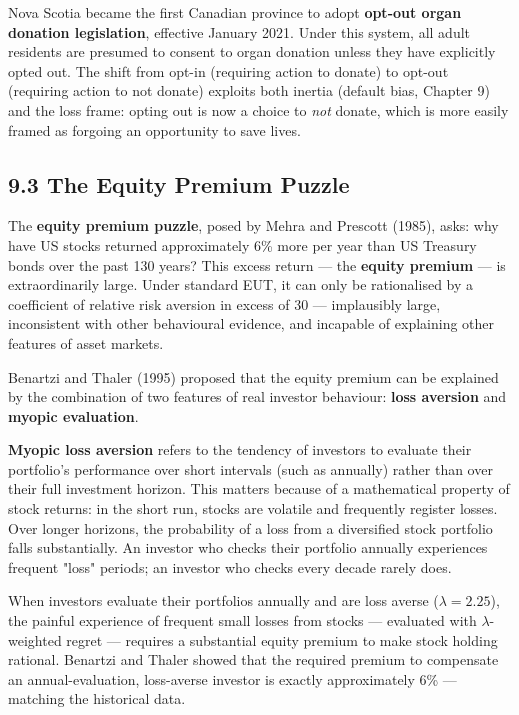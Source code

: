 \documentclass[12pt, letterpaper]{article}
\begin{document}
Nova Scotia became the first Canadian province to adopt \textbf{opt-out organ donation legislation}, effective January 2021. Under this system, all adult residents are presumed to consent to organ donation unless they have explicitly opted out. The shift from opt-in (requiring action to donate) to opt-out (requiring action to not donate) exploits both inertia (default bias, Chapter 9) and the loss frame: opting out is now a choice to \textit{not} donate, which is more easily framed as forgoing an opportunity to save lives.


\subsection{9.3 The Equity Premium Puzzle}


The \textbf{equity premium puzzle}, posed by Mehra and Prescott (1985), asks: why have US stocks returned approximately 6\% more per year than US Treasury bonds over the past 130 years? This excess return --- the \textbf{equity premium} --- is extraordinarily large. Under standard EUT, it can only be rationalised by a coefficient of relative risk aversion in excess of 30 --- implausibly large, inconsistent with other behavioural evidence, and incapable of explaining other features of asset markets.

Benartzi and Thaler (1995) proposed that the equity premium can be explained by the combination of two features of real investor behaviour: \textbf{loss aversion} and \textbf{myopic evaluation}.

\textbf{Myopic loss aversion} refers to the tendency of investors to evaluate their portfolio's performance over short intervals (such as annually) rather than over their full investment horizon. This matters because of a mathematical property of stock returns: in the short run, stocks are volatile and frequently register losses. Over longer horizons, the probability of a loss from a diversified stock portfolio falls substantially. An investor who checks their portfolio annually experiences frequent "loss" periods; an investor who checks every decade rarely does.

When investors evaluate their portfolios annually and are loss averse ($\lambda = 2.25$), the painful experience of frequent small losses from stocks --- evaluated with $\lambda$-weighted regret --- requires a substantial equity premium to make stock holding rational. Benartzi and Thaler showed that the required premium to compensate an annual-evaluation, loss-averse investor is exactly approximately 6\% --- matching the historical data.
\end{document}
